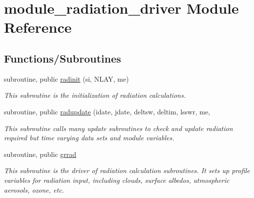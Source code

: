 \hypertarget{namespacemodule__radiation__driver}{}\section{module\+\_\+radiation\+\_\+driver Module Reference}
\label{namespacemodule__radiation__driver}
\subsection*{Functions/\+Subroutines}
{\bf }\par
\begin{DoxyCompactItemize}
\item 
subroutine, public \hyperlink{group__module__radiation__driver_ga866dcd42f95b3e7df6b448833fe7c33b}{radinit} (si, N\+L\+AY, me)
\begin{DoxyCompactList}\small\item\em This subroutine is the initialization of radiation calculations. \end{DoxyCompactList}\end{DoxyCompactItemize}

{\bf }\par
\begin{DoxyCompactItemize}
\item 
subroutine, public \hyperlink{group__module__radiation__driver_gab34c4eb6e32fd200a6385ae70c5dab12}{radupdate} (idate, jdate, deltsw, deltim, lsswr, me,
\begin{DoxyCompactList}\small\item\em This subroutine calls many update subroutines to check and update radiation required but time varying data sets and module variables. \end{DoxyCompactList}\end{DoxyCompactItemize}

{\bf }\par
\begin{DoxyCompactItemize}
\item 
subroutine, public \hyperlink{group__module__radiation__driver_ga955c841d2ffda6975007d94101b79f7a}{grrad}
\begin{DoxyCompactList}\small\item\em This subroutine is the driver of radiation calculation subroutines. It sets up profile variables for radiation input, including clouds, surface albedos, atmospheric aerosols, ozone, etc. \end{DoxyCompactList}\end{DoxyCompactItemize}

